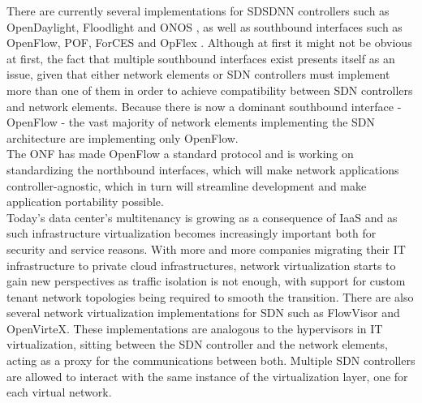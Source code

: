 There are currently several implementations for SD\gls{SDN}N controllers such as OpenDaylight\cite{OpenDaylight}, Floodlight\cite{Floodlight} and ONOS\cite{ControllerComparison} \cite{Kreutz2014}, as well as southbound interfaces such as OpenFlow, POF, ForCES and OpFlex \cite{Kreutz2014}.
Although at first it might not be obvious at first, the fact that multiple southbound interfaces exist presents itself as an issue, given that either network elements or \gls{SDN} controllers must implement more than one of them in order to achieve compatibility between \gls{SDN} controllers and network elements.
Because there is now a dominant southbound interface - OpenFlow - the vast majority of network elements implementing the \gls{SDN} architecture are implementing only OpenFlow.\\
%
The \gls{ONF} has made OpenFlow a standard protocol and is working on standardizing the northbound interfaces\cite{OFWP}, which will make network applications controller-agnostic, which in turn will streamline development and make application portability possible.\\
%
Today's data center's multitenancy is growing as a consequence of \gls{IaaS} and as such infrastructure virtualization becomes increasingly important both for security and service reasons.
With more and more companies migrating their \gls{IT} infrastructure to private cloud infrastructures, network virtualization starts to gain new perspectives as traffic isolation is not enough, with support for custom tenant network topologies being required to smooth the transition.
There are also several network virtualization implementations for \gls{SDN} such as FlowVisor\cite{Sherwooda}\cite{Sherwood} and OpenVirteX\cite{Kreutz2014}.
These implementations are analogous to the hypervisors in \gls{IT} virtualization, sitting between the \gls{SDN} controller and the network elements, acting as a proxy for the communications between both.
Multiple \gls{SDN} controllers are allowed to interact with the same instance of the virtualization layer, one for each virtual network.\\
%
